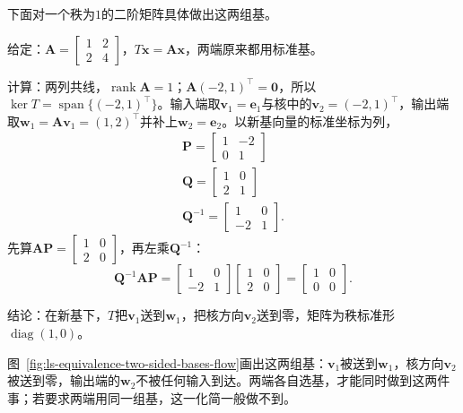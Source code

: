 下面对一个秩为$1$的二阶矩阵具体做出这两组基。
\begin{example}[两端各自选基化为秩标准形]
\label{ex:ls-rank-normal-form-two-by-two}
给定：$\bm A=\left[\begin{smallmatrix}1&2\\2&4\end{smallmatrix}\right]$，$T\bm x=\bm A\bm x$，两端原来都用标准基。

计算：两列共线，$\operatorname{rank}\bm A=1$；$\bm A(-2,1)^\top=\bm0$，所以$\ker T=\operatorname{span}\{(-2,1)^\top\}$。输入端取$\bm v_1=\bm e_1$与核中的$\bm v_2=(-2,1)^{\top}$，输出端取$\bm w_1=\bm A\bm v_1=(1,2)^{\top}$并补上$\bm w_2=\bm e_2$。以新基向量的标准坐标为列，
\[
\begin{gathered}
\bm P=\begin{bmatrix}1&-2\\0&1\end{bmatrix}\\
\bm Q=\begin{bmatrix}1&0\\2&1\end{bmatrix}\\
\bm Q^{-1}=\begin{bmatrix}1&0\\-2&1\end{bmatrix}.
\end{gathered}
\]
先算$\bm A\bm P=\left[\begin{smallmatrix}1&0\\2&0\end{smallmatrix}\right]$，再左乘$\bm Q^{-1}$：
\[
 \bm Q^{-1}\bm A\bm P=\begin{bmatrix}1&0\\-2&1\end{bmatrix}\begin{bmatrix}1&0\\2&0\end{bmatrix}
 =\begin{bmatrix}1&0\\0&0\end{bmatrix}.
\]

结论：在新基下，$T$把$\bm v_1$送到$\bm w_1$，把核方向$\bm v_2$送到零，矩阵为秩标准形$\operatorname{diag}(1,0)$。
\end{example}
图~\ref{fig:ls-equivalence-two-sided-bases-flow}画出这两组基：$\bm v_1$被送到$\bm w_1$，核方向$\bm v_2$被送到零，输出端的$\bm w_2$不被任何输入到达。两端各自选基，才能同时做到这两件事；若要求两端用同一组基，这一化简一般做不到。
